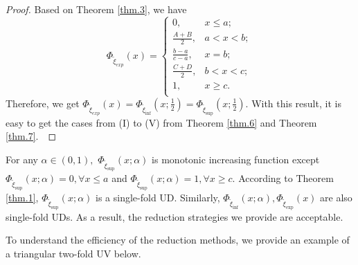 \begin{proof}
	Based on Theorem \ref{thm.3}, we have 
	\[\Phi_{\tilde{\xi}_{exp}}(x)=\left\{
	\begin{array}{ll}
		0, & x\leq a;\\
		\frac{A+B}{2}, &  a<x<b;\\
		\frac{b-a}{c-a}, &  x=b;\\
			\frac{C+D}{2}, &  b<x<c;\\
		1, &  x\geq c.\\
	\end{array}
	\right.
	\] 
	Therefore, we get $\Phi_{\tilde{\xi}_{exp}}(x)=\Phi_{\tilde{\xi}_{\inf}}(x;\frac{1}{2})=\Phi_{\tilde{\xi}_{\sup}}(x;	\frac{1}{2})$. With this result, it is easy to get the cases from (I) to (V) from Theorem \ref{thm.6} and Theorem \ref{thm.7}. 
\end{proof}
\begin{remark}
	For any $\alpha\in(0,1),$ $\Phi_{\tilde{\xi}_{\sup}}(x;\alpha)$ is monotonic increasing function except $\Phi_{\tilde{\xi}_{\sup}}(x;\alpha)=0,\forall x\leq a$ and $\Phi_{\tilde{\xi}_{\sup}}(x;\alpha)=1, \forall x\geq c.$ According to Theorem \ref{thm.1}, $\Phi_{\tilde{\xi}_{\sup}}(x;\alpha)$ is a single-fold UD. Similarly, $\Phi_{\tilde{\xi}_{\inf}}(x;\alpha),\Phi_{\tilde{\xi}_{\exp}}(x)$ are also single-fold UDs. As a result, the reduction strategies we provide are acceptable.
	\end{remark}
\par To understand the efficiency of the reduction methods, we provide an example of a triangular two-fold UV below.
